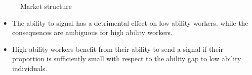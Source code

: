 \begin{frame}\begin{figure}[htp]\centering
\caption{Market structure}
\end{figure}\end{frame}
\begin{frame}
\begin{itemize}\setlength\itemsep{1em}
\item The ability to signal has a detrimental effect on low ability workers, while the consequences are ambiguous for high ability workers.

\item High ability workers benefit from their ability to send a signal if their proportion is sufficiently small with respect to the ability gap to low ability individuals.
\end{itemize}
\end{frame}
